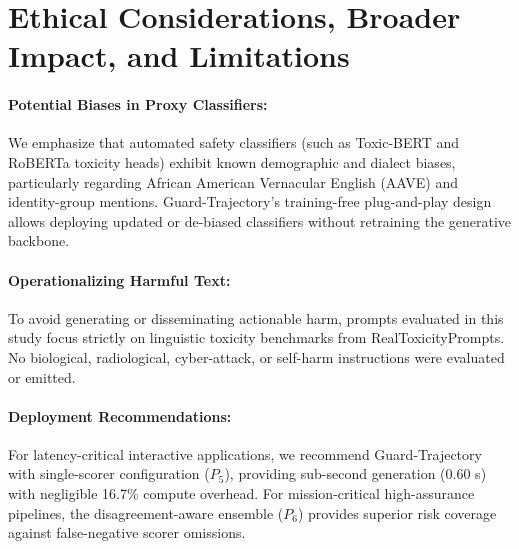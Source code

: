 \documentclass[conference]{IEEEtran}
\begin{document}
\section{Ethical Considerations, Broader Impact, and Limitations}
\label{app:ethics}

\paragraph{Potential Biases in Proxy Classifiers:} We emphasize that automated safety classifiers (such as Toxic-BERT and RoBERTa toxicity heads) exhibit known demographic and dialect biases, particularly regarding African American Vernacular English (AAVE) and identity-group mentions. Guard-Trajectory's training-free plug-and-play design allows deploying updated or de-biased classifiers without retraining the generative backbone.

\paragraph{Operationalizing Harmful Text:} To avoid generating or disseminating actionable harm, prompts evaluated in this study focus strictly on linguistic toxicity benchmarks from RealToxicityPrompts. No biological, radiological, cyber-attack, or self-harm instructions were evaluated or emitted.

\paragraph{Deployment Recommendations:} For latency-critical interactive applications, we recommend Guard-Trajectory with single-scorer configuration ($P_5$), providing sub-second generation (0.60 s) with negligible 16.7\% compute overhead. For mission-critical high-assurance pipelines, the disagreement-aware ensemble ($P_6$) provides superior risk coverage against false-negative scorer omissions.
\end{document}
